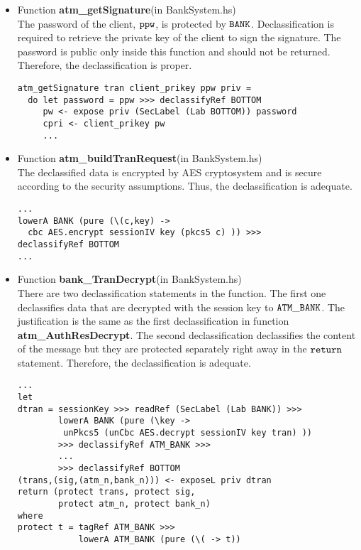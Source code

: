 \documentclass{report}
\newcommand{\co}[1]{$\cod{#1}$}
\begin{document}
\begin{itemize}
\item Function \textbf{atm\_getSignature}(in BankSystem.hs) \\
      The password of the client, \co{ppw}, is protected by \co{BANK}. 
      Declassification is required to retrieve the private key
      of the client to sign the signature. The password is public only inside this function and
      should not be returned. Therefore, the declassification is proper.
\begin{Verbatim}[fontsize=\small]
atm_getSignature tran client_prikey ppw priv =
  do let password = ppw >>> declassifyRef BOTTOM
     pw <- expose priv (SecLabel (Lab BOTTOM)) password
     cpri <- client_prikey pw
     ...
\end{Verbatim}

\item Function \textbf{atm\_buildTranRequest}(in BankSystem.hs) \\
      The declassified data is encrypted by AES cryptosystem and is secure according to
      the security assumptions. Thus, the declassification is adequate.
\begin{Verbatim}[fontsize=\small]
...
lowerA BANK (pure (\(c,key) -> 
  cbc AES.encrypt sessionIV key (pkcs5 c) )) >>>
declassifyRef BOTTOM
...
\end{Verbatim}

\item Function \textbf{bank\_TranDecrypt}(in BankSystem.hs) \\
      There are two declassification statements in the function. The first one declassifies data that are decrypted with
      the session key to \co{ATM\_BANK}. The justification is the same as the first declassification in function
      \textbf{atm\_AuthResDecrypt}. The second declassification declassifies the content of the message but
      they are protected separately right away in the \co{return} statement. Therefore, the declassification
      is adequate.
\begin{Verbatim}[fontsize=\small]
...
let 
dtran = sessionKey >>> readRef (SecLabel (Lab BANK)) >>>
        lowerA BANK (pure (\key -> 
         unPkcs5 (unCbc AES.decrypt sessionIV key tran) ))
        >>> declassifyRef ATM_BANK >>>
        ...
        >>> declassifyRef BOTTOM
(trans,(sig,(atm_n,bank_n))) <- exposeL priv dtran
return (protect trans, protect sig, 
        protect atm_n, protect bank_n)
where
protect t = tagRef ATM_BANK >>> 
            lowerA ATM_BANK (pure (\( -> t))
\end{Verbatim}


\end{itemize}
\end{document}
